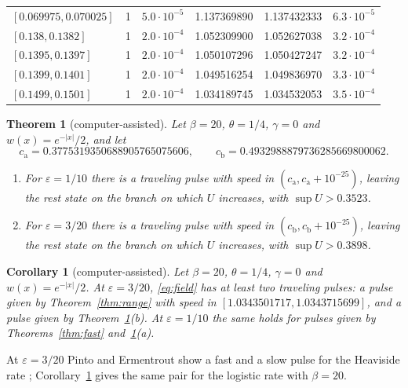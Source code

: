 \documentclass[11pt]{article}
\newtheorem{theorem}{Theorem}
\newtheorem{corollary}[lemma]{Corollary}
\theoremstyle{definition}
\newcommand{\eps}{\varepsilon}
\begin{document}
\begin{table}[t]
\begin{tabular}{lrcccc}
\midrule
$[0.069975, 0.070025]$ & 1 & $5.0\cdot 10^{-5}$ & 1.137369890 & 1.137432333 & $6.3\cdot 10^{-5}$ \\
$[0.138, 0.1382]$ & 1 & $2.0\cdot 10^{-4}$ & 1.052309900 & 1.052627038 & $3.2\cdot 10^{-4}$ \\
$[0.1395, 0.1397]$ & 1 & $2.0\cdot 10^{-4}$ & 1.050107296 & 1.050427247 & $3.2\cdot 10^{-4}$ \\
$[0.1399, 0.1401]$ & 1 & $2.0\cdot 10^{-4}$ & 1.049516254 & 1.049836970 & $3.3\cdot 10^{-4}$ \\
$[0.1499, 0.1501]$ & 1 & $2.0\cdot 10^{-4}$ & 1.034189745 & 1.034532053 & $3.5\cdot 10^{-4}$ \\
\bottomrule
\end{tabular}
\end{table}

\begin{theorem}[computer-assisted]\label{thm:slow}
Let $\beta = 20$, $\theta = 1/4$, $\gamma = 0$ and $w(x) = e^{-|x|}/2$, and let
\[
  c_{\mathrm a} = 0.3775319350688905765075606, \qquad c_{\mathrm b} = 0.4932988879736285669800062.
\]
\begin{enumerate}
\item[(a)] For $\eps = 1/10$ there is a traveling pulse with speed in $(c_{\mathrm a}, c_{\mathrm a} + 10^{-25})$, leaving the rest state on the branch on which $U$ increases, with $\sup U > 0.3523$.
\item[(b)] For $\eps = 3/20$ there is a traveling pulse with speed in $(c_{\mathrm b}, c_{\mathrm b} + 10^{-25})$, leaving the rest state on the branch on which $U$ increases, with $\sup U > 0.3898$.
\end{enumerate}
\end{theorem}

\begin{corollary}[computer-assisted]\label{cor:two}
Let $\beta = 20$, $\theta = 1/4$, $\gamma = 0$ and $w(x) = e^{-|x|}/2$. At $\eps = 3/20$, \eqref{eq:field} has at least two traveling pulses: a pulse given by Theorem~\ref{thm:range} with speed in $[1.0343501717,\allowbreak 1.0343715699]$, and a pulse given by Theorem~\ref{thm:slow}(b). At $\eps = 1/10$ the same holds for pulses given by Theorems~\ref{thm:fast} and~\ref{thm:slow}(a).
\end{corollary}

At $\eps = 3/20$ Pinto and Ermentrout show a fast and a slow pulse for the Heaviside rate \cite[Figs.~7 and~8]{pe2001}; Corollary~\ref{cor:two} gives the same pair for the logistic rate with $\beta = 20$.
\end{document}

